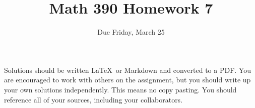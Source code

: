 \documentclass{article}
\title{Math 390 Homework 7}
\author{Due Friday, March 25}
\date{}
\begin{document}

\maketitle

\setlength{\parindent}{0em} %
\setlength{\parskip}{1em} %



Solutions should be written \LaTeX\ or Markdown and converted to a PDF. You are encouraged to work with others
on the assignment, but you should write up your own solutions independently. This means no copy pasting. You should
reference all of your sources, including your collaborators. 
\end{document}
